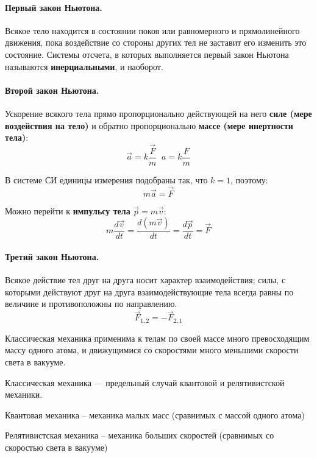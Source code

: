 \documentclass{article}
\begin{document}
      \paragraph{Первый закон Ньютона.}
      Всякое тело находится в состоянии покоя или равномерного и прямолинейного движения, пока воздействие со стороны других тел не заставит его изменить это состояние. Системы отсчета, в которых выполняется первый закон Ньютона называются \textbf{инерциальными}, и наоборот.
      \paragraph{Второй закон Ньютона.}
      Ускорение всякого тела прямо пропорционально действующей на него \textbf{силе (мере воздействия на тело)} и обратно пропорционально \textbf{массе (мере инертности тела)}:
      \begin{equation}
	\vec a=k\frac{\vec F}{m} \;\; a=k\frac{F}{m}
      \end{equation}
    \par
      В системе СИ единицы измерения подобраны так, что $k=1$, поэтому:
      \begin{equation}
	m\vec a=\vec F
      \end{equation}
    \par
      Можно перейти к \textbf{импульсу тела} $\vec p=m\vec v$:
      \begin{equation}
	m\frac{d\vec v}{dt}=\frac{d(m\vec v)}{dt}=\frac{d\vec p}{dt}=\vec F
      \end{equation}
    \par    
      \paragraph{Третий закон Ньютона.}
      Всякое действие тел друг на друга носит характер взаимодействия; силы, с которыми действуют друг на друга взаимодействующие тела всегда равны по величине и противоположны по направлению.
      \begin{equation}
	\vec F_{1,2}=-\vec F_{2,1}
      \end{equation}
    \par
      Классическая механика применима к телам по своей массе много превосходящим массу одного атома, и движущимися со скоростями много меньшими скорости света в вакууме.
    \par
      Классическая механика --- предельный случай квантовой и релятивистской механики.
    \par
      Квантовая механика -- механика малых масс (сравнимых с массой одного атома)
    \par
      Релятивистская механика -- механика больших скоростей (сравнимых со скоростью света в вакууме)
  \clearpage
\end{document}
